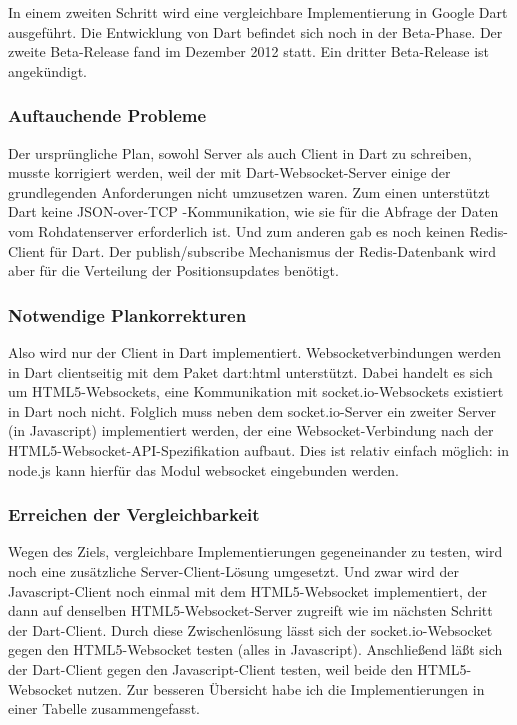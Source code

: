 In einem zweiten Schritt wird eine vergleichbare Implementierung in Google Dart ausgeführt. Die Entwicklung von Dart befindet sich noch in der Beta-Phase. Der zweite Beta-Release fand im Dezember 2012 statt. Ein dritter Beta-Release ist angekündigt. 
\subsubsection{Auftauchende Probleme}
Der ursprüngliche Plan, sowohl Server als auch Client in Dart zu schreiben, musste korrigiert werden, weil der mit Dart-Websocket-Server einige der grundlegenden Anforderungen nicht umzusetzen waren. Zum einen unterstützt Dart keine JSON-over-TCP -Kommunikation, wie sie für die Abfrage der Daten vom Rohdatenserver erforderlich ist. Und zum anderen gab es noch keinen Redis-Client für Dart. Der publish/subscribe Mechanismus der Redis-Datenbank wird aber für die Verteilung der Positionsupdates benötigt.
\subsubsection{Notwendige Plankorrekturen}
Also wird nur der Client in Dart implementiert. Websocketverbindungen werden in Dart clientseitig mit dem Paket dart:html unterstützt. Dabei handelt es sich um HTML5-Websockets, eine Kommunikation mit socket.io-Websockets existiert in Dart noch nicht.
Folglich muss neben dem socket.io-Server ein zweiter Server (in Javascript) implementiert werden, der eine Websocket-Verbindung nach der HTML5-Websocket-API-Spezifikation aufbaut. Dies ist relativ einfach  möglich: in node.js kann hierfür das Modul websocket eingebunden werden.
\subsubsection{Erreichen der Vergleichbarkeit}
Wegen des Ziels, vergleichbare Implementierungen gegeneinander zu testen, wird noch eine zusätzliche Server-Client-Lösung umgesetzt. Und zwar wird der Javascript-Client noch einmal mit dem HTML5-Websocket implementiert, der dann auf denselben HTML5-Websocket-Server zugreift wie im nächsten Schritt der Dart-Client. Durch diese Zwischenlösung lässt sich der socket.io-Websocket gegen den HTML5-Websocket testen (alles in Javascript).
Anschließend läßt sich der Dart-Client gegen den Javascript-Client testen, weil beide den HTML5-Websocket nutzen. Zur besseren Übersicht habe ich die Implementierungen in einer Tabelle zusammengefasst.


\renewcommand{\arraystretch}{1.2}


